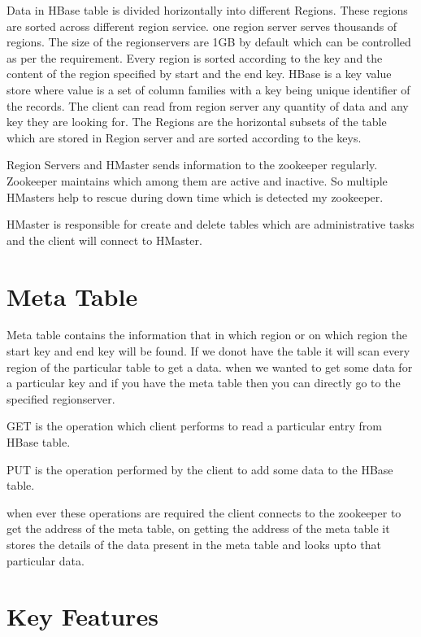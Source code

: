  Data in HBase table is divided horizontally into different Regions. These 
regions are sorted across different region service. one region server serves 
thousands of regions. The size of the regionservers are 1GB by default which 
can be controlled as per the requirement. Every region is sorted according to 
the key and the content of the region specified by start and the end key. HBase
is a key value store where value is a set of column families with a key being 
unique identifier of the records. The client can read from region server any 
quantity of data and any key they are looking for. The Regions are the horizontal
subsets of the table which are stored in Region server and are sorted according 
to the keys. 

 Region Servers and HMaster sends information to the zookeeper regularly. 
Zookeeper maintains which among them are active and inactive. So multiple 
HMasters help to rescue during down time which is detected my zookeeper. 

 HMaster is responsible for create and delete tables which are administrative 
 tasks and the client will connect to HMaster.

 \section{Meta Table} Meta table contains the information that in which region or
 on which region the start key and end key will be found. If we donot have the 
 table it will scan every region of the particular table to get a data. when we 
 wanted to get some data for a particular key and if you have the meta table then 
 you can directly go to the specified regionserver.
 \begin{description}
 \item GET is the operation which client performs to read a particular entry from
  HBase table.
\item PUT is the operation performed by the client to add some data to the HBase
 table.
\end{description}
 when ever these operations are required the client connects to the zookeeper to
 get the address of the meta table, on getting the address of the meta table it 
 stores the details of the data present in the meta table and looks upto that 
 particular data. 



\section{Key Features}

